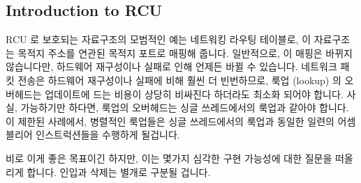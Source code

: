 
\subsection{Introduction to RCU}
\label{sec:defer:Introduction to RCU}

RCU 로 보호되는 자료구조의 모범적인 예는 네트워킹 라우팅 테이블로, 이
자료구조는 목적지 주소를 연관된 목적지 포트로 매핑해 줍니다.
일반적으로, 이 매핑은 바뀌지 않습니다만, 하드웨어 재구성이나 실패로 인해 언제든
바뀔 수 있습니다.
네트워크 패킷 전송은 하드웨어 재구성이나 실패에 비해 훨씬 더 빈번하므로, 룩업
(lookup) 의 오버헤드는 업데이트에 드는 비용이 상당히 비싸진다 하더라도 최소화
되어야 합니다.
사실, 가능하기만 하다면, 룩업의 오버헤드는 싱글 쓰레드에서의 룩업과 같아야
합니다.
이 제한된 사례에서, 병렬적인 룩업들은 싱글 쓰레드에서의 룩업과 동일한 일련의
어셈블리어 인스트럭션들을 수행하게 될겁니다.

비로 이게 좋은 목표이긴 하지만, 이는 몇가지 심각한 구현 가능성에 대한 질문을
떠올리게 합니다.
인입과 삭제는 별개로 구분될 겁니다.

